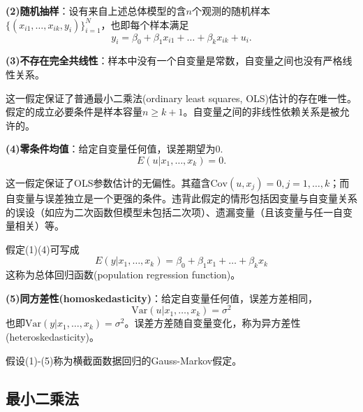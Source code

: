 \par \textbf{(2)随机抽样}：设有来自上述总体模型的含$n$个观测的随机样本$\{(x_{i1}, \dots, x_{ik}, y_i)\}_{i=1}^N$，也即每个样本满足
\begin{equation}
    y_i=\beta_0+\beta_1 x_{i1}+\dots+\beta_k x_{ik} +u_i.
\end{equation}

\par \textbf{(3)不存在完全共线性}：样本中没有一个自变量是常数，自变量之间也没有严格线性关系。
\par 这一假定保证了普通最小二乘法(ordinary least squares, OLS)估计的存在唯一性。假定的成立必要条件是样本容量$n\ge k+1$。自变量之间的非线性依赖关系是被允许的。

\par \textbf{(4)零条件均值}：给定自变量任何值，误差期望为0.
\begin{equation}
    E(u\vert x_1, \dots, x_k)=0.
\end{equation}
\par 这一假定保证了OLS参数估计的无偏性。其蕴含$\text{Cov}(u,x_j)=0, j=1,\dots,k$；而自变量与误差独立是一个更强的条件。违背此假定的情形包括因变量与自变量关系的误设（如应为二次函数但模型未包括二次项）、遗漏变量（且该变量与任一自变量相关）等。
\par 假定(1)(4)可写成
\begin{equation}
    E(y\vert x_1,\dots,x_k)=\beta_0+\beta_1 x_1+\dots+\beta_k x_k
\end{equation}
这称为总体回归函数(population regression function)。

\par \textbf{(5)同方差性(homoskedasticity)}：给定自变量任何值，误差方差相同，
\begin{equation}
    \text{Var}(u\vert x_1, \dots, x_k)=\sigma^2
\end{equation}
也即$\text{Var}(y\vert x_1, \dots, x_k)=\sigma^2$。误差方差随自变量变化，称为异方差性(heteroskedasticity)。
\par 假设(1)-(5)称为横截面数据回归的Gauss-Markov假定。

\subsection{最小二乘法}

